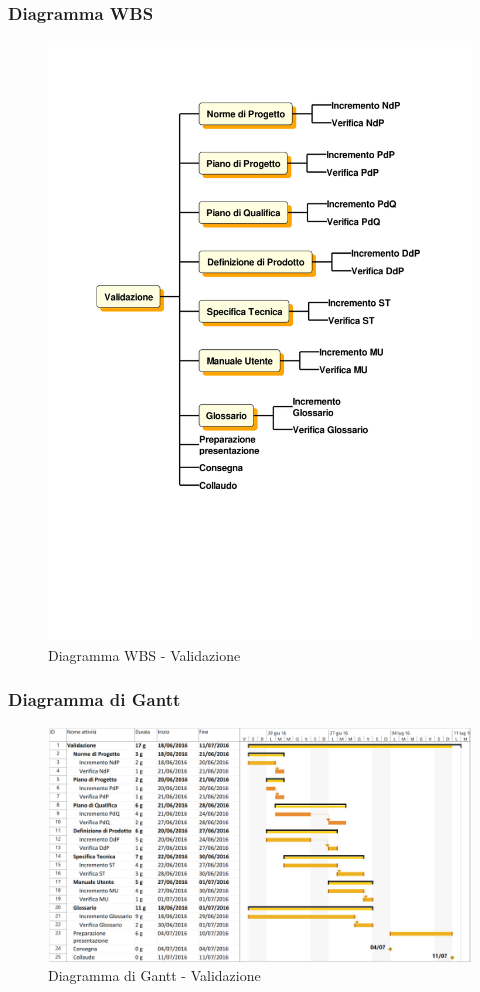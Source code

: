 \subsubsection{Diagramma WBS}
\begin{figure}[H]
	\centering
	\includegraphics[width= 15cm]{immagini/va_wbs.pdf}
	\caption{Diagramma WBS - Validazione}
\end{figure}

\subsubsection{Diagramma di Gantt}
\begin{figure}[H]
	\centering
	\includegraphics[width= 16cm]{immagini/va_gantt.png}
	\caption{Diagramma di Gantt - Validazione}
\end{figure}
\newpage